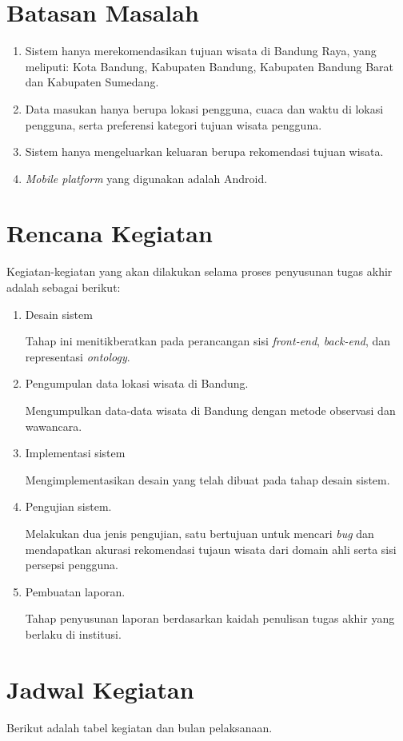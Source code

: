 \section{Batasan Masalah}
\begin{enumerate}
	\item Sistem hanya merekomendasikan tujuan wisata di Bandung Raya, yang meliputi: Kota Bandung, Kabupaten Bandung, Kabupaten Bandung Barat dan Kabupaten Sumedang.
	\item Data masukan hanya berupa lokasi pengguna, cuaca  dan waktu di lokasi pengguna, serta preferensi kategori tujuan wisata pengguna.
	\item Sistem hanya mengeluarkan keluaran berupa rekomendasi tujuan wisata.
	\item \textit{Mobile platform} yang digunakan adalah Android.
\end{enumerate}
\section{Rencana Kegiatan}
Kegiatan-kegiatan yang akan dilakukan selama proses penyusunan tugas akhir adalah sebagai berikut:
\begin{enumerate}
	\item Desain sistem
	\par
	Tahap ini menitikberatkan pada perancangan sisi \textit{front-end}, \textit{back-end}, dan representasi \textit{ontology}.
	\item Pengumpulan data lokasi wisata di Bandung.
	\par
	Mengumpulkan data-data wisata di Bandung dengan metode observasi dan wawancara.
	\item Implementasi sistem
	\par
	Mengimplementasikan desain yang telah dibuat pada tahap desain sistem.
	\item Pengujian sistem.
	\par
	Melakukan dua jenis pengujian, satu bertujuan untuk mencari \textit{bug} dan mendapatkan akurasi rekomendasi tujaun wisata dari domain ahli serta sisi 
	persepsi pengguna. 
	\item Pembuatan laporan.
	\par
	Tahap penyusunan laporan berdasarkan kaidah penulisan tugas akhir yang berlaku di institusi.
\end{enumerate}
\section{Jadwal Kegiatan}
Berikut adalah tabel kegiatan dan bulan pelaksanaan.
 
